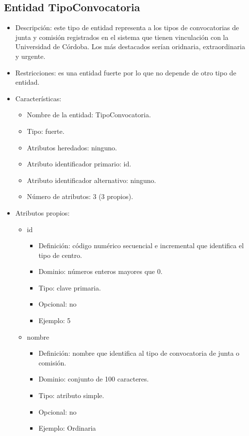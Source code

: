 \subsection{Entidad TipoConvocatoria}
\begin{itemize}
    \item Descripción: este tipo de entidad representa a los tipos de convocatorias de junta y comisión registrados en el sistema que tienen vinculación con la Universidad de Córdoba. Los más destacados serían oridnaria, extraordinaria y urgente.
    \item Restricciones: es una entidad fuerte por lo que no depende de otro tipo de entidad.
    \item Características:
    \begin{itemize}
        \item Nombre de la entidad: TipoConvocatoria.
        \item Tipo: fuerte.
        \item Atributos heredados: ninguno.
        \item Atributo identificador primario: id.
        \item Atributo identificador alternativo: ninguno.
        \item Número de atributos: 3 (3 propios).
    \end{itemize}

    \item Atributos propios:
    \begin{itemize}
        \item id
        \begin{itemize}
            \item Definición: código numérico secuencial e incremental que identifica el tipo de centro.
            \item Dominio: números enteros mayores que 0.
            \item Tipo: clave primaria.
            \item Opcional: no
            \item Ejemplo: 5
        \end{itemize}

        \item nombre
        \begin{itemize}
            \item Definición: nombre que identifica al tipo de convocatoria de junta o comisión.
            \item Dominio: conjunto de 100 caracteres.
            \item Tipo: atributo simple.
            \item Opcional: no
            \item Ejemplo: Ordinaria
        \end{itemize}


\end{itemize}
\end{itemize}
